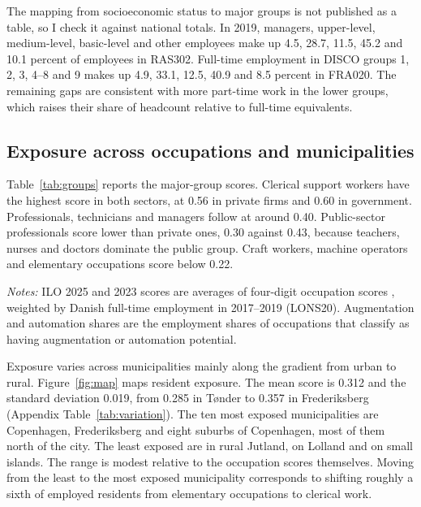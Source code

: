 \documentclass[12pt]{article}
\begin{document}
The mapping from socioeconomic status to major groups is not published as a table, so I check it against national totals. In 2019, managers, upper-level, medium-level, basic-level and other employees make up 4.5, 28.7, 11.5, 45.2 and 10.1 percent of employees in RAS302. Full-time employment in DISCO groups 1, 2, 3, 4--8 and 9 makes up 4.9, 33.1, 12.5, 40.9 and 8.5 percent in FRA020. The remaining gaps are consistent with more part-time work in the lower groups, which raises their share of headcount relative to full-time equivalents.

\subsection{Exposure across occupations and municipalities}

Table~\ref{tab:groups} reports the major-group scores. Clerical support workers have the highest score in both sectors, at 0.56 in private firms and 0.60 in government. Professionals, technicians and managers follow at around 0.40. Public-sector professionals score lower than private ones, 0.30 against 0.43, because teachers, nurses and doctors dominate the public group. Craft workers, machine operators and elementary occupations score below 0.22.

\begin{table}[t]
\centering
\caption{Generative AI exposure by DISCO major group}\label{tab:groups}
\resizebox{\textwidth}{!}{}
\begin{minipage}{\textwidth}
\footnotesize \smallskip
\textit{Notes:} ILO 2025 and 2023 scores are averages of four-digit occupation scores \citep{gmyrek2025, gmyrek2023}, weighted by Danish full-time employment in 2017--2019 (LONS20). Augmentation and automation shares are the employment shares of occupations that \citet{gmyrek2023} classify as having augmentation or automation potential.
\end{minipage}
\end{table}

Exposure varies across municipalities mainly along the gradient from urban to rural. Figure~\ref{fig:map} maps resident exposure. The mean score is 0.312 and the standard deviation 0.019, from 0.285 in Tønder to 0.357 in Frederiksberg (Appendix Table~\ref{tab:variation}). The ten most exposed municipalities are Copenhagen, Frederiksberg and eight suburbs of Copenhagen, most of them north of the city. The least exposed are in rural Jutland, on Lolland and on small islands. The range is modest relative to the occupation scores themselves. Moving from the least to the most exposed municipality corresponds to shifting roughly a sixth of employed residents from elementary occupations to clerical work.
\end{document}
